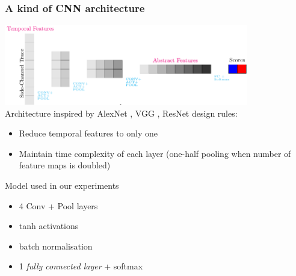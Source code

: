 \begin{frame}
\frametitle{A kind of CNN architecture}
\vspace*{-10pt}
\includegraphics[width=0.8\textwidth]{../tikz_per_manuscritto/convnet_arch.pdf} \\
Architecture inspired by AlexNet \textcolor{cyan}{\cite{KSH12}}, VGG \textcolor{cyan}{\cite{simonyan2014very}}, ResNet \textcolor{cyan}{\cite{he2016deep}} design rules:
\begin{itemize}
\item Reduce temporal features to only one
\item Maintain time complexity of each layer (one-half pooling when number of feature maps is doubled)
\end{itemize}
\begin{block}{Model used in our experiments}
\begin{itemize}
\item 4 Conv + Pool layers
\item tanh activations
\item batch normalisation \textcolor{cyan}{\cite{batch_norm}}
\item 1 \emph{fully connected layer} + softmax
\end{itemize}
\end{block}

\end{frame}

